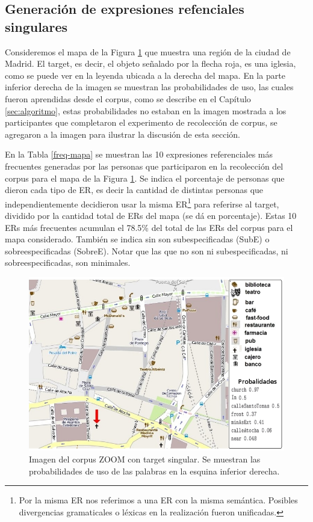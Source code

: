 \subsection{Generaci\'on de expresiones refenciales singulares}
\label{sec:sinzoom}

Consideremos el mapa de la Figura \ref{mapa-zoom1} que muestra una regi\'on de la ciudad de Madrid. El target, es decir, el objeto se\~nalado por la flecha roja, es una iglesia, como se puede ver en la leyenda ubicada a la derecha del mapa. En la parte inferior derecha de la imagen se muestran las probabilidades de uso, las cuales fueron aprendidas desde el corpus, como se describe en el Cap\'itulo \ref{sec:algoritmo}, estas probabilidades no estaban en la imagen mostrada a los participantes que completaron el experimento de recolecci\'on de corpus, se agregaron a la imagen para ilustrar la discusi\'on de esta secci\'on.

En la Tabla \ref{freq-mapa} se muestran las 10 expresiones referenciales m\'as frecuentes generadas por las personas que participaron 
en la recolecci\'on del corpus para el mapa de la Figura \ref{mapa-zoom1}. Se indica el porcentaje de personas que dieron cada tipo de ER, es decir la cantidad de distintas personas que independientemente decidieron usar la misma ER\footnote{Por la misma ER nos referimos a una ER con la misma sem\'antica. Posibles divergencias gramaticales o l\'exicas en la realizaci\'on fueron unificadas.} para referirse al target, dividido por la cantidad total de ERs del mapa (se d\'a en porcentaje). Estas 10 ERs m\'as frecuentes acumulan el 78.5\% del total de las ERs del corpus para el mapa considerado. Tambi\'en se indica sin son subespecificadas (SubE) o sobreespecificadas (SobreE). Notar que las que no son ni subespecificadas, ni sobreespecificadas, son minimales.\\


\begin{figure}
\begin{center}
\includegraphics[width=\textwidth]{images/corpus/mapa6-prob.png}
\caption{Imagen del corpus ZOOM con target singular. Se muestran las probabilidades de uso de las palabras en la esquina inferior derecha.}
\label{mapa-zoom1}
\end{center}
\end{figure}

